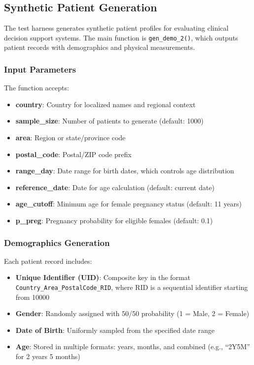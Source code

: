 
\subsection{Synthetic Patient Generation}

The test harness generates synthetic patient profiles for evaluating clinical decision support systems. The main function is \texttt{gen\_demo\_2()}, which outputs patient records with demographics and physical measurements.

\subsubsection{Input Parameters}

The function accepts:
\begin{itemize}
    \item \textbf{country}: Country for localized names and regional context
    \item \textbf{sample\_size}: Number of patients to generate (default: 1000)
    \item \textbf{area}: Region or state/province code
    \item \textbf{postal\_code}: Postal/ZIP code prefix
    \item \textbf{range\_day}: Date range for birth dates, which controls age distribution
    \item \textbf{reference\_date}: Date for age calculation (default: current date)
    \item \textbf{age\_cutoff}: Minimum age for female pregnancy status (default: 11 years)
    \item \textbf{p\_preg}: Pregnancy probability for eligible females (default: 0.1)
\end{itemize}

\subsubsection{Demographics Generation}

Each patient record includes:
\begin{itemize}
    \item \textbf{Unique Identifier (UID)}: Composite key in the format \texttt{Country\_Area\_PostalCode\_RID}, where RID is a sequential identifier starting from 10000
    \item \textbf{Gender}: Randomly assigned with 50/50 probability (1 = Male, 2 = Female)
    \item \textbf{Date of Birth}: Uniformly sampled from the specified date range
    \item \textbf{Age}: Stored in multiple formats: years, months, and combined (e.g., ``2Y5M'' for 2 years 5 months)
\end{itemize}

